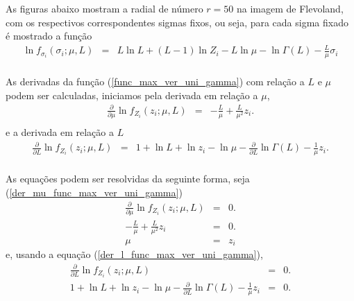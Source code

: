 As figuras abaixo mostram a radial de número $r=50$ na imagem de Flevoland, com os respectivos correspondentes sigmas fixos, ou seja, para cada sigma fixado é mostrado a função 
\begin{equation}\label{cap_acf_23}
\begin{array}{ccc}
	\ln f_{\sigma_i}(\sigma_i;\mu,L)&=& L\ln L +(L - 1) \ln Z_{i}-L \ln \mu-\ln \Gamma(L) -\frac{L}{\mu} \sigma_i\\
\end{array}
\end{equation}


As derivadas da função (\ref{func_max_ver_uni_gamma}) com relação a $L$ e $\mu$ podem ser calculadas, iniciamos pela derivada em relação a $\mu$,
\begin{equation}\label{der_mu_func_max_ver_uni_gamma}
\begin{array}{ccc}
	\frac{\partial}{\partial \mu}\ln f_{Z_{i}}(z_{i};\mu,L)&=& -\frac{L}{\mu} + \frac{L}{\mu^2} z_i.\\
\end{array}
\end{equation}
e a derivada em relação a $L$
\begin{equation}\label{der_l_func_max_ver_uni_gamma}
\begin{array}{ccc}
	\frac{\partial}{\partial L}\ln f_{Z_{i}}(z_{i};\mu,L)&=&1 + \ln L + \ln z_{i}-\ln \mu -\frac{\partial}{\partial L}\ln \Gamma(L)-\frac{1}{\mu} z_i.\\
\end{array}
\end{equation}


As equações podem ser resolvidas da seguinte forma, seja (\ref{der_mu_func_max_ver_uni_gamma}) 
\begin{equation}\label{der_mu_func_max_ver_uni_gamma_equal_to_zero}
\begin{array}{ccc}
\frac{\partial}{\partial \mu}\ln f_{Z_{i}}(z_{i};\mu,L)&=&0.\\
	 -\frac{L}{\mu} + \frac{L}{\mu^2} z_i&=&0.\\%
	 \mu &=& z_i
\end{array}
\end{equation}
e, usando a equação (\ref{der_l_func_max_ver_uni_gamma}),
\begin{equation}\label{der_l_func_max_ver_uni_gamma_equal_to_zero}
\begin{array}{ccc}
	\frac{\partial}{\partial L}\ln f_{Z_{i}}(z_{i};\mu,L)&=&0.\\
	1 + \ln L + \ln z_{i}-\ln \mu -\frac{\partial}{\partial L}\ln \Gamma(L)-\frac{1}{\mu} z_i&=&0.\\
\end{array}
\end{equation}

